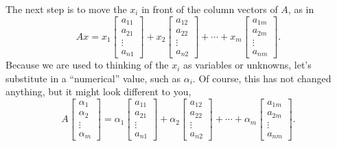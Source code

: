 The next step is to move the $x_i$ in front of the column vectors of $A$, as in
$$Ax = {x}_1 \begin{bmatrix} a_{11} \\ a_{21}\\ \vdots \\ a_{n1} \end{bmatrix}  + {x}_2  \begin{bmatrix} a_{12} \\ a_{22}\\ \vdots \\ a_{n2} \end{bmatrix}  + \cdots + {x}_m \begin{bmatrix} a_{1m} \\ a_{2m}\\ \vdots \\ a_{nm} \end{bmatrix}. $$
Because we are used to thinking of the $x_i$ as variables or unknowns, let's substitute in a ``numerical'' value, such as $\alpha_i.$ Of course, this has not changed anything, but it might look different to you,
$$A\left[ \begin{array}{c} \alpha_1 \\ \alpha_2\\
\vdots \\ \alpha_m  \end{array} \right] = \alpha_1 \begin{bmatrix} a_{11} \\ a_{21}\\ \vdots \\ a_{n1} \end{bmatrix}  + \alpha_2  \begin{bmatrix} a_{12} \\ a_{22}\\ \vdots \\ a_{n2} \end{bmatrix}  + \cdots + \alpha_m \begin{bmatrix} a_{1m} \\ a_{2m}\\ \vdots \\ a_{nm} \end{bmatrix}. $$

